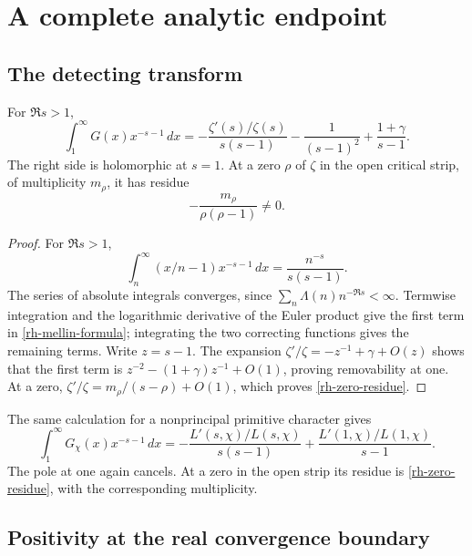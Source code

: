 \section{A complete analytic endpoint}
\label{rh-analytic}

\subsection{The detecting transform}

\begin{lemma}
\label{rh-mellin}
For $\Re s>1$,
\begin{equation}\label{rh-mellin-formula}
 \int_1^\infty G(x)x^{-s-1}\,dx
 =-\frac{\zeta'(s)/\zeta(s)}{s(s-1)}
       -\frac1{(s-1)^2}+\frac{1+\gamma}{s-1}.
\end{equation}
The right side is holomorphic at $s=1$. At a zero $\rho$ of $\zeta$
in the open critical strip, of multiplicity $m_\rho$, it has residue
\begin{equation}\label{rh-zero-residue}
                       -\frac{m_\rho}{\rho(\rho-1)}\ne0.
\end{equation}
\end{lemma}

\begin{proof}
For $\Re s>1$,
\[
 \int_n^\infty(x/n-1)x^{-s-1}\,dx
       =\frac{n^{-s}}{s(s-1)}.
\]
The series of absolute integrals converges, since
$\sum_n\Lambda(n)n^{-\Re s}<\infty$. Termwise integration and the
logarithmic derivative of the Euler product give the first term in
\eqref{rh-mellin-formula}; integrating the two correcting functions
gives the remaining terms. Write $z=s-1$. The expansion
$\zeta'/\zeta=-z^{-1}+\gamma+O(z)$ shows that the first term is
$z^{-2}-(1+\gamma)z^{-1}+O(1)$, proving removability at one.
At a zero, $\zeta'/\zeta=m_\rho/(s-\rho)+O(1)$, which proves
\eqref{rh-zero-residue}.
\end{proof}

The same calculation for a nonprincipal primitive character gives
\begin{equation}\label{rh-dirichlet-mellin}
 \int_1^\infty G_\chi(x)x^{-s-1}\,dx
 =-\frac{L'(s,\chi)/L(s,\chi)}{s(s-1)}
                 +\frac{L'(1,\chi)/L(1,\chi)}{s-1}.
\end{equation}
The pole at one again cancels. At a zero in the open strip its residue
is \eqref{rh-zero-residue}, with the corresponding multiplicity.

\subsection{Positivity at the real convergence boundary}

